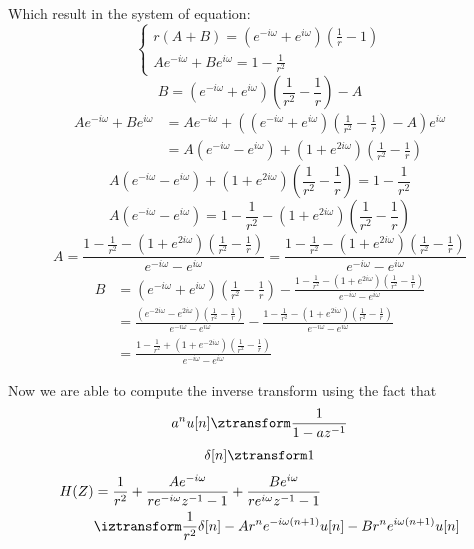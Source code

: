 Which result in the system of equation:
\[\begin{cases}
		r(A+B) = (e^{-i\omega} + e^{i\omega})\left(\frac{1}{r} - 1\right) \\
		Ae^{-i\omega} + Be^{i\omega} = 1 - \frac{1}{r^2}
	\end{cases}\]
\[
	B = (e^{-i\omega} + e^{i\omega})\left(\frac{1}{r^2} - \frac{1}{r}\right) - A\]
\begin{align*}
	Ae^{-i\omega} + Be^{i\omega}
	 & = Ae^{-i\omega} +  \left((e^{-i\omega} + e^{i\omega})\left(\frac{1}{r^2} - \frac{1}{r}\right) - A\right)e^{i\omega}
	\\ &= A(e^{-i\omega} - e^{i\omega}) + (1 + e^{2i\omega}) \left(\frac{1}{r^2} - \frac{1}{r}\right)
\end{align*}
\[
	A(e^{-i\omega} - e^{i\omega}) + (1 + e^{2i\omega}) \left(\frac{1}{r^2} - \frac{1}{r}\right) = 1 - \frac{1}{r^2} \]
\[
	A(e^{-i\omega} - e^{i\omega}) = 1 - \frac{1}{r^2} - (1 + e^{2i\omega}) \left(\frac{1}{r^2} - \frac{1}{r}\right)\]
\[
	A
	= \frac{1 - \frac{1}{r^2} - (1 + e^{2i\omega}) \left(\frac{1}{r^2} - \frac{1}{r}\right)}{e^{-i\omega} - e^{i\omega}}
	= \frac{1 - \frac{1}{r^2} - (1 + e^{2i\omega}) \left(\frac{1}{r^2} - \frac{1}{r}\right)}{e^{-i\omega} - e^{i\omega}} \]
\begin{align*}
	B
	 & = (e^{-i\omega} + e^{i\omega})\left(\frac{1}{r^2} - \frac{1}{r}\right) - \frac{1 - \frac{1}{r^2} - (1 + e^{2i\omega}) \left(\frac{1}{r^2} - \frac{1}{r}\right)}{e^{-i\omega} - e^{i\omega}}
	\\ &= \frac{(e^{-2i\omega} - e^{2i\omega})\left(\frac{1}{r^2} - \frac{1}{r}\right)}{e^{-i\omega} - e^{i\omega}} - \frac{1 - \frac{1}{r^2} - (1 + e^{2i\omega}) \left(\frac{1}{r^2} - \frac{1}{r}\right)}{e^{-i\omega} - e^{i\omega}}
	\\ &= \frac{1 - \frac{1}{r^2} + (1 + e^{-2i\omega}) \left(\frac{1}{r^2} - \frac{1}{r}\right)}{e^{-i\omega} - e^{i\omega}}
\end{align*}

\begin{center}
\end{center}

Now we are able to compute the inverse transform using the fact that
\[a^n u[n] \ztransform \frac{1}{1-az^{-1}}\]
\[\delta[n] \ztransform 1\]
\begin{align*}
	H(Z)
	 & = \frac{1}{r^2} + \frac{Ae^{-i\omega}}{re^{-i\omega}z^{-1} - 1} + \frac{Be^{i\omega}}{re^{i\omega}z^{-1} - 1}
	\\ & \iztransform \frac{1}{r^2}
	\delta[n] - Ar^ne^{-i\omega(n+1)}u[n] - Br^ne^{i\omega(n+1)}u[n]
\end{align*}